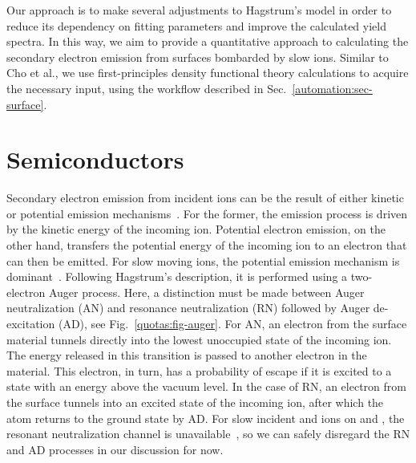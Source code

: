 \begin{refsection}
Our approach is to make several adjustments to Hagstrum's model in order to 
reduce its dependency on fitting parameters and improve the calculated yield 
spectra. In this way, we aim to provide a quantitative approach to calculating 
the secondary electron emission from surfaces bombarded by slow ions. Similar 
to Cho et al., we use first-principles density functional theory calculations 
to acquire the necessary input, using the workflow described in 
Sec.~\ref{automation:sec-surface}. 
 
\section{Semiconductors} \label{quotas:sec-see} 

Secondary electron emission from incident ions can be the result of either 
kinetic or potential emission mechanisms~\cite{Burgdorfer2007}. For the 
former, the emission process is driven by the kinetic energy of the incoming 
ion. Potential electron emission, on the other hand, transfers the potential 
energy of the incoming ion to an electron that can then be emitted.  For slow 
moving ions, the potential emission mechanism is dominant~\cite{Aumayr2007}. 
Following Hagstrum's description, it is performed using a two-electron Auger 
process. Here, a distinction must be made between Auger neutralization (\gls{AN}) 
and resonance neutralization (\gls{RN}) followed by Auger de-excitation (\gls{AD}), see 
Fig.~\ref{quotas:fig-auger}. For \gls{AN}, an electron from the surface material 
tunnels directly into the lowest unoccupied state of the incoming ion. The 
energy released in this transition is passed to another electron in the 
material. This electron, in turn, has a probability of escape if it is excited 
to a state with an energy above the vacuum level. In the case of \gls{RN}, an 
electron from the surface tunnels into an excited state of the incoming ion, 
after which the atom returns to the ground state by \gls{AD}. For slow incident 
 and  ions on  and , the resonant 
neutralization channel is unavailable~\cite{Hagstrum1961, Lorente1994}, so we 
can safely disregard the \gls{RN} and \gls{AD} processes in our discussion for now. 


\end{refsection}
